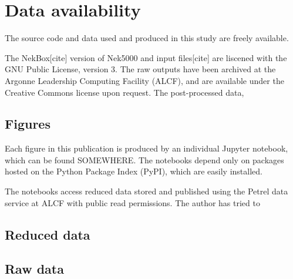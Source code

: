 \section{Data availability} 

The source code and data used and produced in this study are freely available.

The NekBox[cite] version of Nek5000 and input files[cite] are liscened with the GNU Public License, version 3.
The raw outputs have been archived at the Argonne Leadership Computing Facility (ALCF), and are available under the Creative Commons license upon request.
The post-processed data, 

\subsection{Figures}
Each figure in this publication is produced by an individual Jupyter notebook, which can be found SOMEWHERE.
The notebooks depend only on packages hosted on the Python Package Index (PyPI), which are easily installed.

The notebooks access reduced data stored and published using the Petrel data service at ALCF with public read permissions.
The author has tried to 

\subsection{Reduced data}

\subsection{Raw data}



